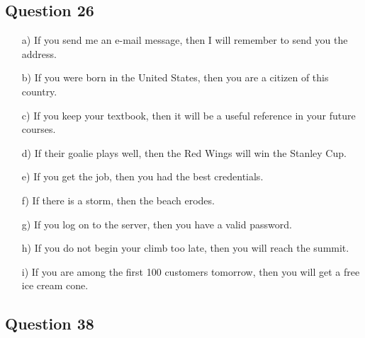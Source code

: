 \documentclass[12pt]{article}
\begin{document}
\subsection*{Question 26}
\begin{itemize}
    \item[a)] If you send me an e-mail message, then I will remember to send you
      the address.
    \item[b)] If you were born in the United States, then you are a citizen of
      this country.
    \item[c)] If you keep your textbook, then it will be a useful reference in
      your future courses.
    \item[d)] If their goalie plays well, then the Red Wings will win the 
      Stanley Cup.
    \item[e)] If you get the job, then you had the best credentials.
    \item[f)] If there is a storm, then the beach erodes.
    \item[g)] If you log on to the server, then you have a valid password.
    \item[h)] If you do not begin your climb too late, then you will reach the 
      summit.
    \item[i)] If you are among the first 100 customers tomorrow, then you will 
      get a free ice cream cone.
\end{itemize}

\subsection*{Question 38}
\end{document}
